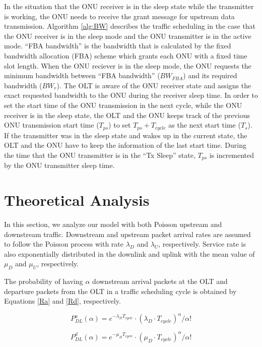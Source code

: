 \documentclass[11pt,english,12pt,onecolumn, draftcls]{IEEEtran}
\theoremstyle{plain}
\theoremstyle{definition}
\begin{document}
In the situation that the ONU receiver is in the sleep state while the transmitter is working, the ONU needs to receive the grant message for upstream data transmission. Algorithm \ref{alg:BW} describes the traffic scheduling in the case that the ONU receiver is in the sleep mode and the ONU transmitter is in the active mode. ``FBA bandwidth'' is the bandwidth that is calculated by the fixed bandwidth allocation (FBA) scheme which grants each ONU with a fixed time slot length. When the ONU reciever is in the sleep mode, the ONU requests the minimum bandwidth between ``FBA bandwidth'' ($BW_{FBA}$) and its required bandwidth ($BW_r$). The OLT is aware of the ONU receiver state and assigns the exact requested bandwidth to the ONU during the receiver sleep time. In order to set the start time of the ONU transmission in the next cycle, while the ONU receiver is in the sleep state, the OLT and the ONU keeps track of the previous ONU transmission start time ($T_{ps}$) to set $T_{ps}+T_{cycle}$ as the next start time ($T_s$). If the transmitter was in the sleep state and wakes up in the current state, the OLT and the ONU have to keep the information of the last start time. During the time that the ONU transmitter is in the ``Tx Sleep'' state, $T_{ps}$ is incremented by the ONU transmitter sleep time.

\section{Theoretical Analysis}
\label{sec:Ana}
In this section, we analyze our model with both Poisson upstream and downstream traffic. Downstream and upstream packet arrival rates are assumed to follow the Poisson process with rate $\lambda_D$ and $\lambda_U$, respectively. Service rate is also exponentially distributed in the downlink and uplink with the mean value of $\mu_D$ and $\mu_U$, respectively.

The probability of having $\alpha$ downstream arrival packets at the OLT and departure packets from the OLT in a traffic scheduling cycle is obtained by Equations \ref{Ra} and \ref{Rd}, respectively.

\begin{equation}
\label{Ra}
P_{DL}^a(\alpha)=e^{-\lambda_D T_{cycle}}\cdot (\lambda_D \cdot T_{cycle})^\alpha/\alpha!
\end{equation}

\begin{equation}
\label{Rd}
P_{DL}^d(\alpha)=e^{-\mu_D T_{cycle}}\cdot (\mu_D \cdot T_{cycle})^\alpha/\alpha!
\end{equation}
\end{document}
